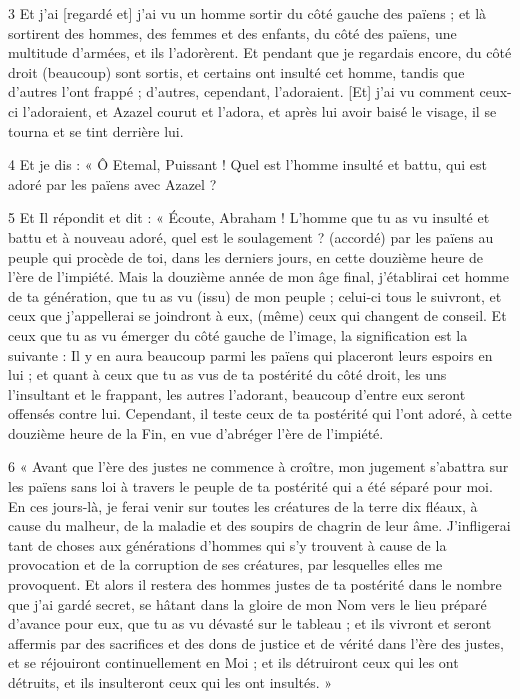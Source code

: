 \par 3 Et j'ai [regardé et] j'ai vu un homme sortir du côté gauche des païens ; et là sortirent des hommes, des femmes et des enfants, du côté des païens, une multitude d'armées, et ils l'adorèrent. Et pendant que je regardais encore, du côté droit (beaucoup) sont sortis, et certains ont insulté cet homme, tandis que d'autres l'ont frappé ; d’autres, cependant, l’adoraient. [Et] j'ai vu comment ceux-ci l'adoraient, et Azazel courut et l'adora, et après lui avoir baisé le visage, il se tourna et se tint derrière lui.

\par 4 Et je dis : « Ô Etemal, Puissant ! Quel est l’homme insulté et battu, qui est adoré par les païens avec Azazel ?

\par 5 Et Il répondit et dit : « Écoute, Abraham ! L'homme que tu as vu insulté et battu et à nouveau adoré, quel est le soulagement ? (accordé) par les païens au peuple qui procède de toi, dans les derniers jours, en cette douzième heure de l'ère de l'impiété. Mais la douzième année de mon âge final, j'établirai cet homme de ta génération, que tu as vu (issu) de mon peuple ; celui-ci tous le suivront, et ceux que j'appellerai se joindront à eux, (même) ceux qui changent de conseil. Et ceux que tu as vu émerger du côté gauche de l'image, la signification est la suivante : Il y en aura beaucoup parmi les païens qui placeront leurs espoirs en lui ; et quant à ceux que tu as vus de ta postérité du côté droit, les uns l'insultant et le frappant, les autres l'adorant, beaucoup d'entre eux seront offensés contre lui. Cependant, il teste ceux de ta postérité qui l'ont adoré, à cette douzième heure de la Fin, en vue d'abréger l'ère de l'impiété.

\par 6 « Avant que l'ère des justes ne commence à croître, mon jugement s'abattra sur les païens sans loi à travers le peuple de ta postérité qui a été séparé pour moi. En ces jours-là, je ferai venir sur toutes les créatures de la terre dix fléaux, à cause du malheur, de la maladie et des soupirs de chagrin de leur âme. J'infligerai tant de choses aux générations d'hommes qui s'y trouvent à cause de la provocation et de la corruption de ses créatures, par lesquelles elles me provoquent. Et alors il restera des hommes justes de ta postérité dans le nombre que j'ai gardé secret, se hâtant dans la gloire de mon Nom vers le lieu préparé d'avance pour eux, que tu as vu dévasté sur le tableau ; et ils vivront et seront affermis par des sacrifices et des dons de justice et de vérité dans l'ère des justes, et se réjouiront continuellement en Moi ; et ils détruiront ceux qui les ont détruits, et ils insulteront ceux qui les ont insultés. »

